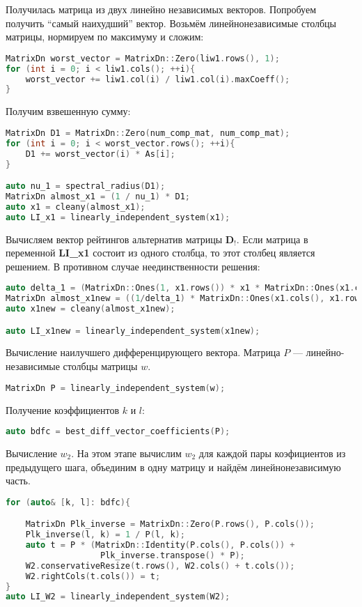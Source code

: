 \documentclass[specialist,
	substylefile = spbu_report.rtx,
	subf,href,colorlinks=true, 12pt]{disser}
\begin{document}
Получилась матрица из двух линейно независимых векторов. Попробуем получить \enquote{самый наихудший} вектор. Возьмём линейнонезависимые столбцы матрицы, нормируем по максимуму и сложим:
\begin{lstlisting}[language=c++,basicstyle=\footnotesize\ttfamily]
MatrixDn worst_vector = MatrixDn::Zero(liw1.rows(), 1);
for (int i = 0; i < liw1.cols(); ++i){
    worst_vector += liw1.col(i) / liw1.col(i).maxCoeff();
}
\end{lstlisting}


Получим взвешенную сумму:
\begin{lstlisting}[language=c++,basicstyle=\footnotesize\ttfamily]
MatrixDn D1 = MatrixDn::Zero(num_comp_mat, num_comp_mat);
for (int i = 0; i < worst_vector.rows(); ++i){
    D1 += worst_vector(i) * As[i];
}

auto nu_1 = spectral_radius(D1);
MatrixDn almost_x1 = (1 / nu_1) * D1;
auto x1 = cleany(almost_x1);
auto LI_x1 = linearly_independent_system(x1);
\end{lstlisting}

Вычисляем вектор рейтингов альтернатив матрицы $\mathbf{D}_{!}$.
Если матрица в переменной \textbf{LI_x1} состоит из одного столбца, то этот столбец является решением. В противном случае неединственности решения:

\begin{lstlisting}[language=c++,basicstyle=\footnotesize\ttfamily]
auto delta_1 = (MatrixDn::Ones(1, x1.rows()) * x1 * MatrixDn::Ones(x1.cols(), 1)).value();
MatrixDn almost_x1new = ((1/delta_1) * MatrixDn::Ones(x1.cols(), x1.rows())) + almost_x1;
auto x1new = cleany(almost_x1new);

auto LI_x1new = linearly_independent_system(x1new);
\end{lstlisting}

Вычисление наилучшего дифференцирующего вектора.
Матрица $P$ --- линейно-независимые столбцы матрицы $w$.
\begin{lstlisting}[language=c++,basicstyle=\footnotesize\ttfamily]
MatrixDn P = linearly_independent_system(w);
\end{lstlisting}

Получение коэффициентов $k$ и $l$:
\begin{lstlisting}[language=c++,basicstyle=\footnotesize\ttfamily]
auto bdfc = best_diff_vector_coefficients(P);
\end{lstlisting}


Вычисление $w_2$. На этом этапе вычислим $w_{2}$ для каждой пары коэфициентов из предыдущего шага, объединим в одну матрицу и найдём линейнонезависимую часть.
\begin{lstlisting}[language=c++,basicstyle=\footnotesize\ttfamily]
for (auto& [k, l]: bdfc){

    MatrixDn Plk_inverse = MatrixDn::Zero(P.rows(), P.cols());
    Plk_inverse(l, k) = 1 / P(l, k);
    auto t = P * (MatrixDn::Identity(P.cols(), P.cols()) +
                   Plk_inverse.transpose() * P);
    W2.conservativeResize(t.rows(), W2.cols() + t.cols());
    W2.rightCols(t.cols()) = t;
}
auto LI_W2 = linearly_independent_system(W2);
\end{lstlisting}
\end{document}
